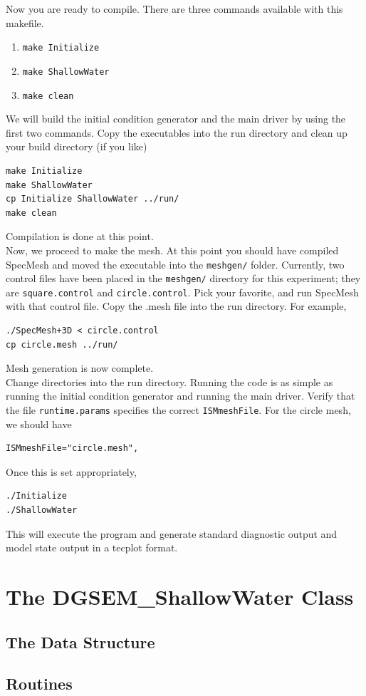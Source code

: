 \documentclass[12pt]{memoir}
\begin{document}
Now you are ready to compile. There are three commands available with this makefile.
\begin{enumerate}
\item \texttt{make Initialize}
\item \texttt{make ShallowWater}
\item \texttt{make clean}
\end{enumerate}
We will build the initial condition generator and the main driver by using the first two commands. Copy the executables into the run directory and clean up your build directory (if you like)
\begin{verbatim}
make Initialize
make ShallowWater
cp Initialize ShallowWater ../run/
make clean
\end{verbatim}
Compilation is done at this point.\\

Now, we proceed to make the mesh. At this point you should have compiled SpecMesh and moved the executable into the \texttt{meshgen/} folder. Currently, two control files have been placed in the \texttt{meshgen/} directory for this experiment; they are \texttt{square.control} and \texttt{circle.control}. Pick your favorite, and run SpecMesh with that control file. Copy the .mesh file into the run directory. For example,
\begin{verbatim}
./SpecMesh+3D < circle.control
cp circle.mesh ../run/
\end{verbatim}
Mesh generation is now complete.\\

Change directories into the run directory. Running the code is as simple as running the initial condition generator and running the main driver. Verify that the file \texttt{runtime.params} specifies the correct \texttt{ISMmeshFile}. For the circle mesh, we should have
\begin{verbatim}
ISMmeshFile="circle.mesh",
\end{verbatim}
Once this is set appropriately,
\begin{verbatim}
./Initialize
./ShallowWater
\end{verbatim}
This will execute the program and generate standard diagnostic output and model state output in a tecplot format.

\chapter{The DGSEM\_ShallowWater Class}\label{chap:Class}

  \section{The Data Structure}

  \section{Routines}
\end{document}
